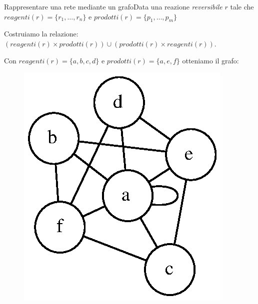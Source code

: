 \documentclass{beamer}
\begin{document}
\begin{frame}{Rappresentare una rete mediante un grafo}{Data una
    reazione \emph{reversibile} $r$ tale che $reagenti(r) = \{ r_{1},
    \ldots, r_{n} \}$ e $prodotti(r) = \{ p_{1}, \ldots, p_{m} \}$}

  Costruiamo la relazione: $(reagenti(r) \times prodotti(r)) \cup
  (prodotti(r) \times reagenti(r))$.
  
    \begin{example}
      Con $reagenti(r) = \{ a, b, c, d \}$ e $prodotti(r) = \{a, e,
      f\}$ otteniamo il grafo:
      \begin{figure}
        \centering
        \includegraphics[scale=.6]{images/reversible-reaction-example.dot.eps}
        \label{fig:reversible-reaction-mapping}
      \end{figure}
    \end{example}
\end{frame}
\end{document}
